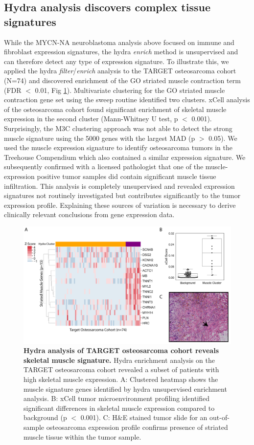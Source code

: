 \documentclass[10pt,letterpaper]{article}
\begin{document}
\subsection*{Hydra analysis discovers complex tissue signatures}
While the MYCN-NA neuroblastoma analysis above focused on immune and fibroblast expression signatures, the hydra \textit{enrich} method is unsupervised and can therefore detect any type of expression signature. To illustrate this, we applied the hydra \textit{filter}/\textit{enrich} analysis to the TARGET osteosarcoma cohort (N=74) and discovered enrichment of the GO striated muscle contraction term (FDR $<$ 0.01, Fig \ref{muscle}). Multivariate clustering for the GO striated muscle contraction gene set using the sweep routine identified two clusters. xCell analysis of the osteosarcoma cohort found significant enrichment of skeletal muscle expression in the second cluster (Mann-Whitney U test, p $<$ 0.001). Surprisingly, the M3C clustering approach was not able to detect the strong muscle signature using the 5000 genes with the largest MAD (p $>$ 0.05). We used the muscle expression signature to identify osteosarcoma tumors in the Treehouse Compendium which also contained a similar expression signature. We subsequently confirmed with a licensed pathologist that one of the muscle-expression positive tumor samples did contain significant muscle tissue infiltration. This analysis is completely unsupervised and revealed expression signatures not routinely investigated but contributes significantly to the tumor expression profile. Explaining these sources of variation is necessary to derive clinically relevant conclusions from gene expression data.

%
%
\begin{figure}[!h]
	\includegraphics[width=\textwidth]{img/PNG/muscle-signature-genes-2x}
	\caption{{\bf Hydra analysis of TARGET osteosarcoma cohort reveals skeletal muscle signature.}
		 Hydra enrichment analysis on the TARGET osteosarcoma cohort revealed a subset of patients with high skeletal muscle expression. A: Clustered heatmap shows the muscle signature genes identified by hydra unsupervised enrichment analysis. B: xCell tumor microenvironment profiling identified significant differences in skeletal muscle expression compared to background (p $<$ 0.001). C: H\&E stained tumor slide for an out-of-sample osteosarcoma expression profile confirms presence of striated muscle tissue within the tumor sample.}
	\label{muscle}
\end{figure}
\end{document}
